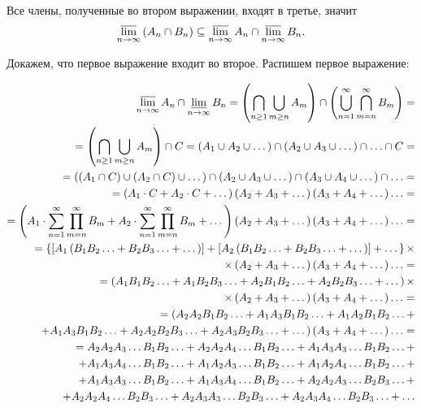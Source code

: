 \documentclass{book}
\begin{document}
Все члены, полученные во втором выражении, входят в третье, значит
$$ \varlimsup \limits_{ n \to \infty } \left( A_n \cap B_n \right) \subseteq
\varlimsup \limits_{ n \to \infty} A_n \cap
\varlimsup \limits_{ n \to \infty } B_n.$$

Докажем, что первое выражение входит во второе.
Распишем первое выражение:

\begin{equation*}
\begin{split}
\varlimsup \limits_{ n \to \infty } A_n \cap \varliminf \limits_{ n \to \infty } B_n =
\left( \bigcap \limits_{ n \geq 1 } \bigcup \limits_{ m \geq n } A_m \right) \cap
\left( \bigcup \limits_{ n = 1 }^\infty \bigcap \limits_{ m = n }^\infty B_m \right) = \\
= \left( \bigcap \limits_{ n \geq 1 } \bigcup \limits_{ m \geq n } A_m \right) \cap C =
\left( A_1 \cup A_2 \cup \dotsc \right) \cap \left( A_2 \cup A_3 \cup \dotsc \right) \cap \dotsc \cap C = \\
= \left( \left( A_1 \cap C \right) \cup \left( A_2 \cap C \right) \cup \dotsc \right) \cap
\left( A_2 \cup A_3 \cup \dotsc \right) \cap \left( A_3 \cup A_4 \cup \dotsc \right) \cap \dotsc = \\
= \left( A_1 \cdot C + A_2 \cdot C + \dotsc \right) \left( A_2 + A_3 + \dotsc \right)
\left( A_3 + A_4 + \dotsc \right) \dotsc = \\
= \left( A_1 \cdot \sum \limits_{ n = 1 }^\infty \prod \limits_{ m = n }^\infty B_m +
A_2 \cdot \sum \limits_{ n = 1 }^\infty \prod \limits_{ m = n }^\infty B_m + \dotsc \right)
\left( A_2 + A_3 + \dotsc \right) \left( A_3 + A_4 + \dotsc \right) \dotsc =  \\
= \left\{ \left[ A_1 \left( B_1 B_2 \dotsc +B_2 B_3 \dotsc + \dotsc \right) \right] +
\left[ A_2 \left( B_1 B_2 \dotsc +B_2 B_3 \dotsc + \dotsc \right) \right] + \dotsc \right\} \times \\
\times \left( A_2 + A_3 + \dotsc \right) \left( A_3+A_4+ \dotsc \right) \dotsc = \\
= \left( A_1 B_1 B_2 \dotsc + A_1 B_2 B_3 \dotsc + A_2 B_1 B_2 \dotsc + A_2 B_2 B_3 \dotsc + \dotsc \right) \times \\
\times \left( A_2 + A_3 + \dotsc \right) \left( A_3 + A_4 + \dotsc \right) \dotsc = \\
= ( A_2 A_2 B_1 B_2 \dotsc + A_1 A_3 B_1 B_2 \dotsc + A_1 A_2 B_1 B_2 \dotsc + \\
+ A_1 A_3 B_1 B_2 \dotsc + A_2 A_2 B_2 B_3 \dotsc + A_2 A_3 B_2 B_3 \dotsc + \dotsc )
\left( A_3 + A_4+ \dotsc \right) \dotsc = \\
= A_2 A_2 A_3 \dotsc B_1 B_2 \dotsc + A_2 A_2 A_4 \dotsc B_1 B_2 \dotsc + A_1 A_3 A_3 \dotsc B_1 B_2 \dotsc + \\
+ A_1 A_3 A_4 \dotsc B_1 B_2 \dotsc + A_1 A_2 A_3 \dotsc B_1 B_2 \dotsc + A_1 A_2 A_4 \dotsc B_1 B_2 \dotsc + \\
+ A_1 A_3 A_3 \dotsc B_1 B_2 \dotsc + A_1 A_3 A_4 \dotsc B_1 B_2 \dotsc + A_2 A_2 A_3 \dotsc B_2 B_3 \dotsc + \\
+ A_2 A_2 A_4 \dotsc B_2 B_3 \dotsc + A_2 A_3 A_3 \dotsc B_2 B_3 \dotsc + A_2 A_3 A_4 \dotsc B_2 B_3 \dotsc + \dotsc 
\end{split}
\end{equation*}
\end{document}
